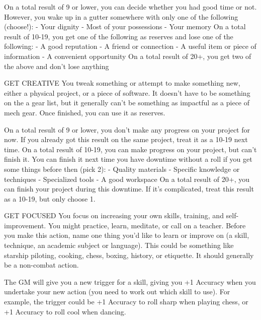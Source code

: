 On a total result of 9 or lower, you can decide whether you had good time or not. However, you  
wake up in a gutter somewhere with only one of the following (choose!):  
    -    Your dignity  
    -    Most of your possessions  
    -    Your memory  
On a total result of 10-19, you get one of the following as reserves and lose one of the following:  
    -    A good reputation  
    -    A friend or connection  
    -    A useful item or piece of information  
    -    A convenient opportunity  
On a total result of 20+, you get two of the above and don’t lose anything  

GET CREATIVE  
You tweak something or attempt to make something new, either a physical project, or a piece of  
software. It doesn’t have to be something on the a gear list, but it generally can’t be something as  
impactful as a piece of mech gear. Once finished, you can use it as reserves.  

                                                                                                                  


On a total result of 9 or lower, you don’t make any progress on your project for now. If you already  
got this result on the same project, treat it as a 10-19 next time.  
On a total result of 10-19, you can make progress on your project, but can’t finish it. You can finish  
it next time you have downtime without a roll if you get some things before then (pick 2):  
    -    Quality materials  
    -    Specific knowledge or techniques  
    -    Specialized tools  
    -    A good workspace  
On a total result of 20+, you can finish your project during this downtime. If it’s complicated, treat  
this result as a 10-19, but only choose 1.  

GET FOCUSED  
You focus on increasing your own skills, training, and self-improvement. You might practice, learn,  
meditate, or call on a teacher. Before you make this action, name one thing you’d like to learn or  
improve on (a skill, technique, an academic subject or language). This could be something like  
starship piloting, cooking, chess, boxing, history, or etiquette. It should generally be a non-combat  
action.  

The GM will give you a new trigger for a skill, giving you +1 Accuracy when you undertake your  
new action (you need to work out which skill to use). For example, the trigger could be +1  
Accuracy to roll sharp when playing chess, or +1 Accuracy to roll cool when dancing.  

